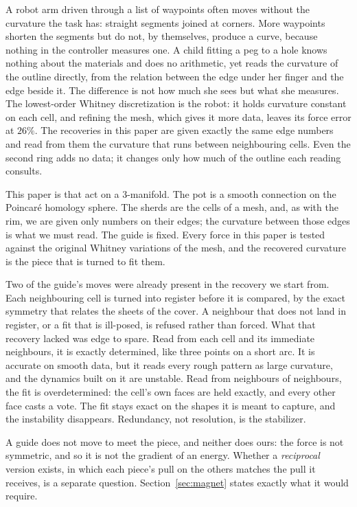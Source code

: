 \documentclass[11pt]{article}
\theoremstyle{definition}
\theoremstyle{remark}
\begin{document}
A robot arm driven through a list of waypoints often moves without the curvature the task
has: straight segments joined at corners. More waypoints shorten the segments but do not,
by themselves, produce a curve, because nothing in the controller measures one. A child
fitting a peg to a hole knows nothing about the materials and does no arithmetic, yet
reads the curvature of the outline directly, from the relation between the edge under her
finger and the edge beside it. The difference is not how much she sees but what she
measures. The lowest-order Whitney discretization is the robot: it holds curvature
constant on each cell, and refining the mesh, which gives it more data, leaves its force
error at $26\%$. The recoveries in this paper are given exactly the same edge numbers and
read from them the curvature that runs between neighbouring cells. Even the second ring
adds no data; it changes only how much of the outline each reading consults.

This paper is that act on a $3$-manifold. The pot is a smooth connection on the
Poincar\'e homology sphere. The sherds are the cells of a mesh, and, as with the rim, we
are given only numbers on their edges; the curvature between those edges is what we must
read. The guide is fixed. Every force in this paper is tested against the original
Whitney variations of the mesh, and the recovered curvature is the piece that is turned
to fit them.

Two of the guide's moves were already present in the recovery we start from. Each
neighbouring cell is turned into register before it is compared, by the exact symmetry
that relates the sheets of the cover. A neighbour that does not land in register, or a
fit that is ill-posed, is refused rather than forced. What that recovery lacked was edge
to spare. Read from each cell and its immediate neighbours, it is exactly determined,
like three points on a short arc. It is accurate on smooth data, but it reads every rough
pattern as large curvature, and the dynamics built on it are unstable. Read from
neighbours of neighbours, the fit is overdetermined: the cell's own faces are held
exactly, and every other face casts a vote. The fit stays exact on the shapes it is
meant to capture, and the instability disappears. Redundancy, not resolution, is the
stabilizer.

A guide does not move to meet the piece, and neither does ours: the force is not
symmetric, and so it is not the gradient of an energy. Whether a \emph{reciprocal}
version exists, in which each piece's pull on the others matches the pull it receives,
is a separate question. Section~\ref{sec:magnet} states exactly what it would require.
\end{document}
